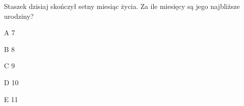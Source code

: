 \begin{tresc}
Staszek dzisiaj skończył setny miesiąc życia. Za ile miesięcy są jego najbliższe urodziny?
\end{tresc}
\begin{wariant}{A} 7 \end{wariant}
\begin{wariant}{B} 8 \end{wariant}
\begin{wariant}{C} 9 \end{wariant}
\begin{wariant}{D} 10 \end{wariant}
\begin{wariant}{E} 11 \end{wariant}
